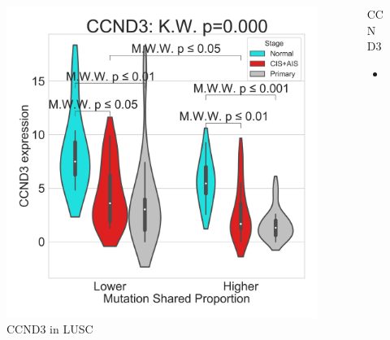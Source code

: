 \documentclass{beamer}
\begin{document}
\begin{frame}[allowframebreaks]
                    \begin{columns}
                        \begin{column}{0.4 \textwidth}
                            \begin{figure}
                                \includegraphics[width=\linewidth]{figures/DEG/Violin/STAR.TPM.SQC.MSP-Median.violin/Mutation Shared Proportion_CCND3.pdf}
                                \caption{CCND3 in LUSC}
                            \end{figure}
                        \end{column}
                        \begin{column}{0.55 \textwidth}
                            \begin{block}{CCND3}
                                \begin{itemize}
                                    \item
                                \end{itemize}
                            \end{block}
                        \end{column}
                    \end{columns}


\end{frame}
\end{document}
